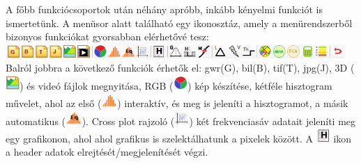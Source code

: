 \documentclass[a4paper,12pt]{article}
\begin{document}
A főbb funkciócsoportok után néhány apróbb, inkább kényelmi funkciót is ismertetünk. A menüsor alatt található egy ikonosztáz, amely a menürendszerből bizonyos funkciókat gyorsabban elérhetővé tesz:\\
\includegraphics[height=0.55cm]{ikonosztaz.png} \\Balról jobbra a következő funkciók érhetők el: gwr(G), bil(B), tif(T), jpg(J), 3D (\includegraphics[height=0.55cm]{3dikon.png}) és videó fájlok megnyitása, RGB (\includegraphics[height=0.55cm]{rgbikon}) kép készítése, kétféle hisztogram művelet, ahol az első (\includegraphics[height=0.55cm]{histo1ikon}) interaktív, és meg is jeleníti a hisztogramot, a másik automatikus (\includegraphics[height=0.55cm]{histo2ikon}). Cross plot rajzoló (\includegraphics[height=0.55cm]{cpikon}) két frekvenciasáv adatait jeleníti meg egy grafikonon, ahol ahol grafikus is szelektálhatunk a pixelek között. A \includegraphics[height=0.55cm]{headerikon} ikon a header adatok elrejtését/megjelenítését végzi. 
\end{document}
